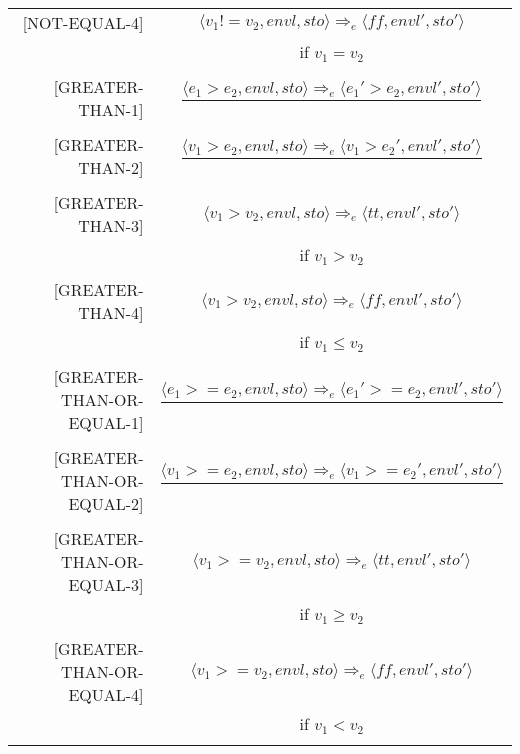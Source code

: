 \begin{longtable}[c] { r c }
  [NOT-EQUAL-4] & \( 
    \langle v_1 != v_2, envl, sto \rangle \Rightarrow_e \langle ff, envl', sto' \rangle \)
  \\
  & if \( v_1 = v_2 \) \\
  & \\

  [GREATER-THAN-1] & \( 
    \dfrac { \langle e_1 > e_2, envl, sto \rangle \Rightarrow_e \langle e_1' > e_2, envl', sto' \rangle }
      { } \)
  \\
  & \\

  [GREATER-THAN-2] & \( 
    \dfrac { \langle v_1 > e_2, envl, sto \rangle \Rightarrow_e \langle v_1 > e_2', envl', sto' \rangle }
      { } \)
  \\
  & \\

  [GREATER-THAN-3] & \( 
    \langle v_1 > v_2, envl, sto \rangle \Rightarrow_e \langle tt, envl', sto' \rangle \)
  \\
  & if \( v_1 > v_2 \) \\
  & \\

  [GREATER-THAN-4] & \( 
    \langle v_1 > v_2, envl, sto \rangle \Rightarrow_e \langle ff, envl', sto' \rangle \)
  \\
  & if \( v_1 \leq v_2 \) \\
  & \\

  [GREATER-THAN-OR-EQUAL-1] & \( 
    \dfrac { \langle e_1 > = e_2, envl, sto \rangle \Rightarrow_e \langle e_1' > = e_2, envl', sto' \rangle }
      { } \)
  \\
  & \\

  [GREATER-THAN-OR-EQUAL-2] & \( 
    \dfrac { \langle v_1 > = e_2, envl, sto \rangle \Rightarrow_e \langle v_1 > = e_2', envl', sto' \rangle }
      { } \)
  \\
  & \\

  [GREATER-THAN-OR-EQUAL-3] & \( 
    \langle v_1 > = v_2, envl, sto \rangle \Rightarrow_e \langle tt, envl', sto' \rangle \)
  \\
  & if \( v_1 \geq v_2 \) \\
  & \\

  [GREATER-THAN-OR-EQUAL-4] & \( 
    \langle v_1 > = v_2, envl, sto \rangle \Rightarrow_e \langle ff, envl', sto' \rangle \)
  \\
  & if \( v_1 < v_2 \) \\
  & \\


\end{longtable}
